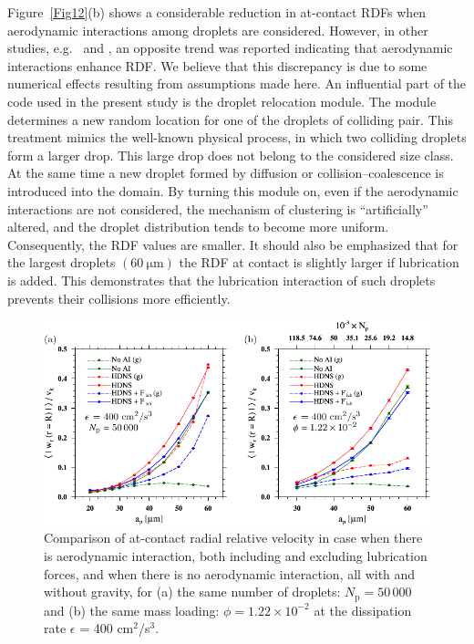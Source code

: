 \documentclass[../thesis.tex]{subfiles}
\begin{document}
Figure~\ref{Fig12}(b) shows a considerable reduction in at-contact RDFs when aerodynamic interactions among droplets are considered. However, in other studies, e.g.\ \cite{BKL97} and \cite{YKHC18}, an opposite trend was reported indicating that aerodynamic interactions enhance RDF. We believe that this discrepancy is due to some numerical effects resulting from assumptions made here. An influential part of the code used in the present study is the droplet relocation module. The module determines a new random location for one of the droplets of colliding pair. This treatment mimics the well-known physical process, in which two colliding droplets form a larger drop. This large drop does not belong to the considered size class. At the same time a new droplet formed by diffusion or collision--coalescence is introduced into the domain. By turning this module on, even if the aerodynamic interactions are not considered, the mechanism of clustering is ``artificially'' altered, and the droplet distribution tends to become more uniform. Consequently, the RDF values are smaller. It should also be emphasized that for the largest droplets $(60~\mathrm{\mu m})$ the RDF at contact is slightly larger if lubrication is added. This demonstrates that the lubrication interaction of such droplets prevents their collisions more efficiently.

\begin{figure}%
\center
\includegraphics[width=\textwidth]{../figs/JFM/fig13.pdf}
\caption{Comparison of at-contact radial relative velocity in case when there is aerodynamic interaction, both including and excluding lubrication forces, and when there is no aerodynamic interaction, all with and without gravity, for (a) the same number of droplets: $N_\mathrm{p} = 50\,000$ and (b) the same mass loading: $\phi = 1.22\times10^{-2}$ at the dissipation rate $\epsilon$ = 400 cm$^2$/s$^3$.}
\label{Fig13}
\end{figure}%
\end{document}
